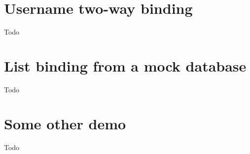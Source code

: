 \documentclass[12pt,twoside,notitlepage]{report}
\begin{document}
\section{Username two-way binding}

Todo

\cleardoublepage

\section{List binding from a mock database}

Todo

\cleardoublepage

\section{Some other demo}

Todo

\cleardoublepage
\end{document}
